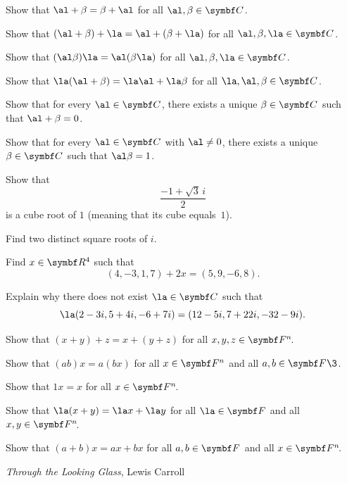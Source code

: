 \begin{exercises}

\exercise
Show that $\al + \beta = \beta + \al$ for all $\al, \beta \in \C{}$.


\exercise
Show that $(\al + \beta) +  \la = \al + (\beta + \la)$ for all $\al, \beta, \la \in \C{}$.


\exercise
Show that $(\al \beta)\la = \al(\beta \la)$ for all $\al, \beta, \la \in \C{}$.


\exercise
Show that $\la(\al + \beta) = \la \al + \la \beta$ for all $\la, \al, \beta \in
\C{}$.


\exercise
Show that for every $\al \in \C{}$, there exists a unique $\beta \in \C{}$ such that
$\al + \beta = 0$.


\exercise
Show that for every $\al \in \C{}$ with $\al \ne 0$, there exists a unique $\beta \in \C{}$ such that $\al \beta = 1$.


\exercise
Show that
\[
\frac{-1 + \sqrt{3} \, i}{2}
\]
is a cube root of $1$ (meaning that its cube  equals~$1$).


\exercise
Find two distinct square roots of $i$.


\exercise
Find $x \in \R{4}$ such that
\[
(4, -3, 1, 7) + 2x = (5, 9, -6, 8).
\]
\exercisedisplayend


\exercise
Explain why there does not exist $\la \in \C{}$ such that
\[
\la (2 - 3i, 5 + 4i, -6 + 7i) = (12 - 5i, 7 + 22i, -32 - 9i).
\]
\exercisedisplayend


\exercise
Show that $(x + y) + z  = x + (y + z) $ for all $x, y, z \in \FF{n}$.


\exercise
Show that $(ab)x = a(bx)$ for all $x \in \F{n}$ and all $a, b \in \F{}\3$.


\exercise
Show that $1x = x$ for all $x \in \FF{n}$.


\exercise
Show that $\la(x + y) = \la x + \la y$ for all $\la \in \F{}$ and all $x, y \in \FF{n}$.


\exercise
Show that $(a + b)x = ax + bx$ for all $a, b \in \F{}$ and all $x \in \FF{n}$.


\end{exercises}

{\textit{Through the Looking Glass}, Lewis Carroll}

